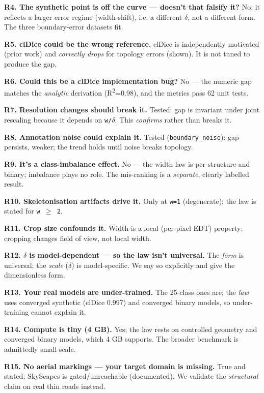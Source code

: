 \documentclass[11pt]{article}
\begin{document}
\textbf{R4. The synthetic point is off the curve --- doesn't that falsify it?} No; it reflects a larger error regime (width-shift), i.e. a different \texttt{$\delta$}, not a different form. The three boundary-error datasets fit.

\textbf{R5. clDice could be the wrong reference.} clDice is independently motivated (prior work) and \textit{correctly drops} for topology errors (shown). It is not tuned to produce the gap.

\textbf{R6. Could this be a clDice implementation bug?} No --- the numeric gap matches the \textit{analytic} derivation (R\textsuperscript{2}=0.98), and the metrics pass 62 unit tests.

\textbf{R7. Resolution changes should break it.} Tested: gap is invariant under joint rescaling because it depends on \texttt{w/$\delta$}. This \textit{confirms} rather than breaks it.

\textbf{R8. Annotation noise could explain it.} Tested (\texttt{boundary\_noise}): gap persists, weaker; the trend holds until noise breaks topology.

\textbf{R9. It's a class-imbalance effect.} No --- the width law is per-structure and binary; imbalance plays no role. The mis-ranking is a \textit{separate}, clearly labelled result.

\textbf{R10. Skeletonisation artifacts drive it.} Only at \texttt{w=1} (degenerate); the law is stated for \texttt{w $\geq$ 2}.

\textbf{R11. Crop size confounds it.} Width is a local (per-pixel EDT) property; cropping changes field of view, not local width.

\textbf{R12. $\delta$ is model-dependent --- so the law isn't universal.} The \textit{form} is universal; the \textit{scale} ($\delta$) is model-specific. We say so explicitly and give the dimensionless form.

\textbf{R13. Your real models are under-trained.} The 25-class ones are; the \textit{law} uses converged synthetic (clDice 0.997) and converged binary models, so under-training cannot explain it.

\textbf{R14. Compute is tiny (4 GB).} Yes; the law rests on controlled geometry and converged binary models, which 4 GB supports. The broader benchmark is admittedly small-scale.

\textbf{R15. No aerial markings --- your target domain is missing.} True and stated; SkyScapes is gated/unreachable (documented). We validate the \textit{structural} claim on real thin roads instead.
\end{document}
